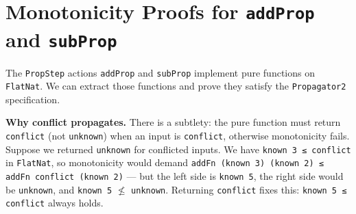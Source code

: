 \documentclass[12pt, a4paper, openright]{book}
\theoremstyle{thmstyle}
\theoremstyle{defstyle}
\newcommand{\lc}[1]{\texttt{#1}}
\begin{document}
\section{Monotonicity Proofs for \texttt{addProp} and \texttt{subProp}}
\label{sec:flatnat-monotone}

The \lc{PropStep} actions \lc{addProp} and \lc{subProp} implement pure functions
on \lc{FlatNat}. We can extract those functions and prove they satisfy the
\lc{Propagator2} specification.

\textbf{Why conflict propagates.}
There is a subtlety: the pure function must return \lc{conflict} (not \lc{unknown})
when an input is \lc{conflict}, otherwise monotonicity fails.
Suppose we returned \lc{unknown} for conflicted inputs. We have
\lc{known 3 ≤ conflict} in \lc{FlatNat}, so monotonicity would demand
\lc{addFn (known 3) (known 2) ≤ addFn conflict (known 2)} --- but the left
side is \lc{known 5}, the right side would be \lc{unknown}, and
\lc{known 5} $\not\leq$ \lc{unknown}.
Returning \lc{conflict} fixes this: \lc{known 5 ≤ conflict} always holds.
\end{document}
